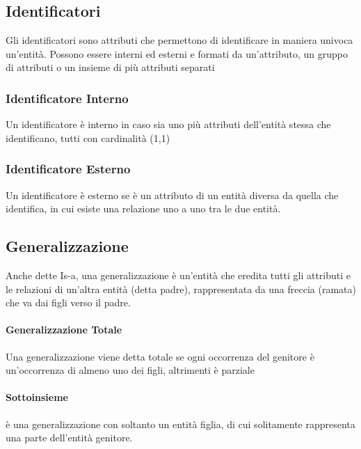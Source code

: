 \documentclass[12pt, a4paper, openany]{book}
\begin{document}
\subsection{Identificatori}
Gli identificatori sono attributi che permettono di identificare in maniera univoca un'entità. Possono essere interni ed esterni e formati da un'attributo, un gruppo di attributi o un insieme di più attributi separati
\subsubsection{Identificatore Interno} 
Un identificatore è interno in caso sia uno più attributi dell'entità stessa che identificano, tutti con cardinalità (1,1)

\subsubsection{Identificatore Esterno}
Un identificatore è esterno se è un attributo di un entità diversa da quella che identifica, in cui esiste una relazione uno a uno tra le due entità.

\subsection{Generalizzazione}
Anche dette Is-a, una generalizzazione è un'entità che eredita tutti gli attributi e le relazioni di un'altra entità
(detta padre), rappresentata da una freccia (ramata) che va dai figli verso il padre.
\paragraph*{Generalizzazione Totale}
Una generalizzazione viene detta totale se ogni occorrenza del genitore è un'occorrenza di almeno uno dei figli, altrimenti è parziale

\paragraph*{Sottoinsieme}
è una generalizzazione con soltanto un entità figlia, di cui solitamente rappresenta una parte dell'entità genitore.
\end{document}
